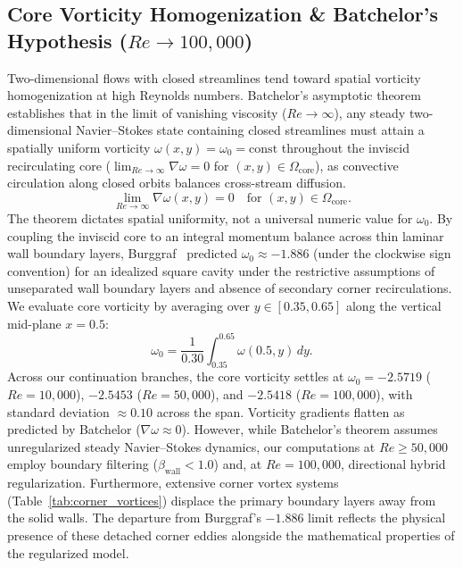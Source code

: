 \documentclass[11pt,a4paper]{article}
\begin{document}
\subsection{\texorpdfstring{Core Vorticity Homogenization \& Batchelor's Hypothesis ($Re \to 100,000$)}{Core Vorticity Homogenization and Batchelor's Hypothesis (Re -> 100,000)}}
Two-dimensional flows with closed streamlines tend toward spatial vorticity homogenization at high Reynolds numbers. Batchelor's asymptotic theorem~\cite{batchelor1956steady} establishes that in the limit of vanishing viscosity ($Re \to \infty$), any steady two-dimensional Navier--Stokes state containing closed streamlines must attain a spatially uniform vorticity $\omega(x, y) = \omega_0 = \text{const}$ throughout the inviscid recirculating core ($\lim_{Re \to \infty} \nabla \omega = 0$ for $(x, y) \in \Omega_{\text{core}}$), as convective circulation along closed orbits balances cross-stream diffusion.
\begin{equation}
    \lim_{Re \to \infty} \nabla \omega(x, y) = 0 \quad \text{for } (x, y) \in \Omega_{\text{core}}.
\end{equation}
The theorem dictates spatial uniformity, not a universal numeric value for $\omega_0$. By coupling the inviscid core to an integral momentum balance across thin laminar wall boundary layers, Burggraf~\cite{burggraf1966analytical} predicted $\omega_0 \approx -1.886$ (under the clockwise sign convention) for an idealized square cavity under the restrictive assumptions of unseparated wall boundary layers and absence of secondary corner recirculations. We evaluate core vorticity by averaging over $y \in [0.35, 0.65]$ along the vertical mid-plane $x = 0.5$:
\begin{equation}
    \omega_0 = \frac{1}{0.30} \int_{0.35}^{0.65} \omega(0.5, y) \, dy.
\end{equation}
Across our continuation branches, the core vorticity settles at $\omega_0 = -2.5719$ ($Re = 10{,}000$), $-2.5453$ ($Re = 50{,}000$), and $-2.5418$ ($Re = 100{,}000$), with standard deviation $\approx 0.10$ across the span. Vorticity gradients flatten as predicted by Batchelor ($\nabla \omega \approx 0$). However, while Batchelor's theorem assumes unregularized steady Navier--Stokes dynamics, our computations at $Re \ge 50{,}000$ employ boundary filtering ($\beta_{\text{wall}} < 1.0$) and, at $Re = 100{,}000$, directional hybrid regularization. Furthermore, extensive corner vortex systems (Table~\ref{tab:corner_vortices}) displace the primary boundary layers away from the solid walls. The departure from Burggraf's $-1.886$ limit reflects the physical presence of these detached corner eddies alongside the mathematical properties of the regularized model.
\end{document}
